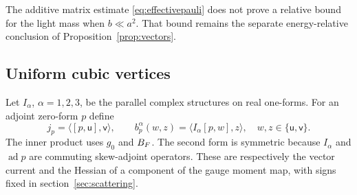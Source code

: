 The additive matrix estimate \eqref{eq:effectivepauli} does not prove a
relative bound for the light mass when $b\ll a^2$. That bound remains
the separate energy-relative conclusion of Proposition~\ref{prop:vectors}.

\subsection{Uniform cubic vertices}
Let $I_\alpha$, $\alpha=1,2,3$, be the parallel complex structures on
real one-forms. For an adjoint zero-form $p$ define
\begin{equation}\label{eq:vertices}
 j_p=\langle[p,\mathsf u],\mathsf v\rangle,\qquad
 b_p^\alpha(w,z)=\langle I_\alpha[p,w],z\rangle,
 \quad w,z\in\{\mathsf u,\mathsf v\}.
\end{equation}
The inner product uses $g_0$ and $B_F$. The second form is symmetric
because $I_\alpha$ and $\operatorname{ad}p$ are commuting skew-adjoint
operators. These are respectively the vector current and the Hessian of
a component of the gauge moment map, with signs fixed in
section~\ref{sec:scattering}.

